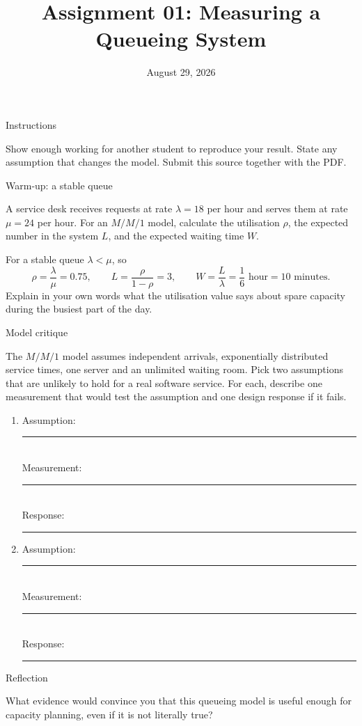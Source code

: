 \documentclass[11pt,a4paper]{assignment}
\title{Assignment 01: Measuring a Queueing System}
\date{August 29, 2026}
\begin{document}
\begin{problemlist}
\pbitem Instructions
\begin{problem}
Show enough working for another student to reproduce your result. State any
assumption that changes the model. Submit this source together with the PDF.
\end{problem}

\pbitem Warm-up: a stable queue
\begin{problem}
A service desk receives requests at rate $\lambda=18$ per hour and serves them
at rate $\mu=24$ per hour. For an $M/M/1$ model, calculate the utilisation
$\rho$, the expected number in the system $L$, and the expected waiting time
$W$.

\begin{answer}
For a stable queue $\lambda<\mu$, so
\[
  \rho=\frac{\lambda}{\mu}=0.75, \qquad
  L=\frac{\rho}{1-\rho}=3, \qquad
  W=\frac{L}{\lambda}=\frac{1}{6}\text{ hour}=10\text{ minutes}.
\]
Explain in your own words what the utilisation value says about spare
capacity during the busiest part of the day.
\end{answer}
\end{problem}

\pbitem Model critique
\begin{problem}
The $M/M/1$ model assumes independent arrivals, exponentially distributed
service times, one server and an unlimited waiting room. Pick two assumptions
that are unlikely to hold for a real software service. For each, describe one
measurement that would test the assumption and one design response if it fails.

\begin{enumerate}
  \item Assumption: \rule{0.62\linewidth}{0.4pt}\\
        Measurement: \rule{0.59\linewidth}{0.4pt}\\
        Response: \rule{0.64\linewidth}{0.4pt}
  \item Assumption: \rule{0.62\linewidth}{0.4pt}\\
        Measurement: \rule{0.59\linewidth}{0.4pt}\\
        Response: \rule{0.64\linewidth}{0.4pt}
\end{enumerate}
\end{problem}

\pbitem Reflection
\begin{problem}
What evidence would convince you that this queueing model is useful enough
for capacity planning, even if it is not literally true?
\end{problem}
\end{problemlist}
\end{document}
